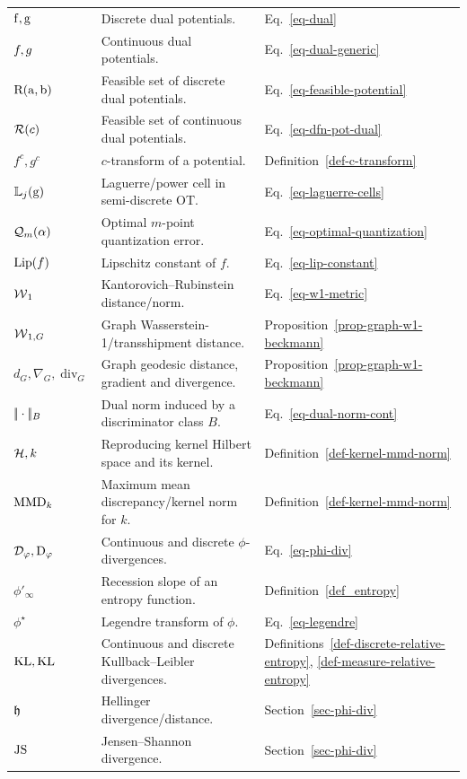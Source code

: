 {\begin{longtable}{>{\raggedright\arraybackslash}p{}
                  >{\raggedright\arraybackslash}p{}
                  >{\raggedright\arraybackslash}p{}}
\hline
\multicolumn{3}{l}{\textbf{Duality, transforms and weak norms}}\\
\hline
$\mathrm{f},\mathrm{g}$ & Discrete dual potentials. & Eq.~\eqref{eq-dual} \\
$f,g$ & Continuous dual potentials. & Eq.~\eqref{eq-dual-generic} \\
$\mathrm{R}(\mathrm{a},\mathrm{b})$ & Feasible set of discrete dual potentials. & Eq.~\eqref{eq-feasible-potential} \\
$\mathcal{R}(c)$ & Feasible set of continuous dual potentials. & Eq.~\eqref{eq-dfn-pot-dual} \\
$f^c,g^c$ & $c$-transform of a potential. & Definition~\ref{def-c-transform} \\
$\mathbb{L}_j(\mathrm{g})$ & Laguerre/power cell in semi-discrete OT. & Eq.~\eqref{eq-laguerre-cells} \\
$\mathcal{Q}_m(\alpha)$ & Optimal $m$-point quantization error. & Eq.~\eqref{eq-optimal-quantization} \\
$\operatorname{Lip}(f)$ & Lipschitz constant of $f$. & Eq.~\eqref{eq-lip-constant} \\
$\operatorname{\mathcal{W}}_1$ & Kantorovich--Rubinstein distance/norm. & Eq.~\eqref{eq-w1-metric} \\
$\operatorname{\mathcal{W}}_{1,G}$ & Graph Wasserstein-1/transshipment distance. & Proposition~\ref{prop-graph-w1-beckmann} \\
$d_G,\nabla_G,\operatorname{div}_G$ & Graph geodesic distance, gradient and divergence. & Proposition~\ref{prop-graph-w1-beckmann} \\
$|\!| \cdot |\!|_B$ & Dual norm induced by a discriminator class $B$. & Eq.~\eqref{eq-dual-norm-cont} \\
$\mathcal{H},k$ & Reproducing kernel Hilbert space and its kernel. & Definition~\ref{def-kernel-mmd-norm} \\
$\operatorname{MMD}_k$ & Maximum mean discrepancy/kernel norm for $k$. & Definition~\ref{def-kernel-mmd-norm} \\
$\mathcal{D}_\varphi,\mathrm{D}_\varphi$ & Continuous and discrete $\phi$-divergences. & Eq.~\eqref{eq-phi-div} \\
$\phi'_\infty$ & Recession slope of an entropy function. & Definition~\ref{def_entropy} \\
$\phi^\star$ & Legendre transform of $\phi$. & Eq.~\eqref{eq-legendre} \\
$\operatorname{KL},\mathrm{KL}$ & Continuous and discrete Kullback--Leibler divergences. & Definitions~\ref{def-discrete-relative-entropy}, \ref{def-measure-relative-entropy} \\
$\mathfrak{h}$ & Hellinger divergence/distance. & Section~\ref{sec-phi-div} \\
$\operatorname{JS}$ & Jensen--Shannon divergence. & Section~\ref{sec-phi-div} \\


\end{longtable}}

